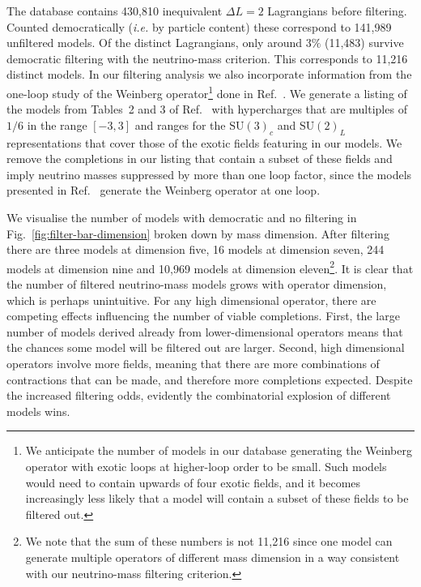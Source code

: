 The database contains 430,810 inequivalent $\Delta L = 2$ Lagrangians before
filtering. Counted democratically (\textit{i.e.} by particle content) these
correspond to 141,989 unfiltered models. Of the distinct Lagrangians, only
around $3\%$ (11,483) survive democratic filtering with the neutrino-mass
criterion. This corresponds to 11,216 distinct models. In our filtering analysis
we also incorporate information from the one-loop study of the Weinberg
operator\footnote{We anticipate the number of models in our database generating
  the Weinberg operator with exotic loops at higher-loop order to be small. Such
  models would need to contain upwards of four exotic fields, and it becomes
  increasingly less likely that a model will contain a subset of these fields to
  be filtered out.} done in Ref.~\cite{Bonnet:2012kz}. We generate a listing of
the models from Tables~2 and 3 of Ref.~\cite{Bonnet:2012kz} with hypercharges
that are multiples of $1/6$ in the range $[-3,3]$ and ranges for the
$\mathrm{SU}(3)_{c}$ and $\mathrm{SU}(2)_{L}$ representations that cover those
of the exotic fields featuring in our models. We remove the completions in our
listing that contain a subset of these fields and imply neutrino masses
suppressed by more than one loop factor, since the models presented in
Ref.~\cite{Bonnet:2012kz} generate the Weinberg operator at one loop.

We visualise the number of models with democratic and no filtering in
Fig.~\ref{fig:filter-bar-dimension} broken down by mass dimension. After
filtering there are three models at dimension five, 16 models at dimension
seven, 244 models at dimension nine and 10,969 models at dimension
eleven\footnote{We note that the sum of these numbers is not 11,216 since one
  model can generate multiple operators of different mass dimension in a way
  consistent with our neutrino-mass filtering criterion.}. It is clear that the
number of filtered neutrino-mass models grows with operator dimension, which is
perhaps unintuitive. For any high dimensional operator, there are competing
effects influencing the number of viable completions. First, the large number of
models derived already from lower-dimensional operators means that the chances
some model will be filtered out are larger. Second, high dimensional operators
involve more fields, meaning that there are more combinations of contractions
that can be made, and therefore more completions expected. Despite the increased
filtering odds, evidently the combinatorial explosion of different models wins.

